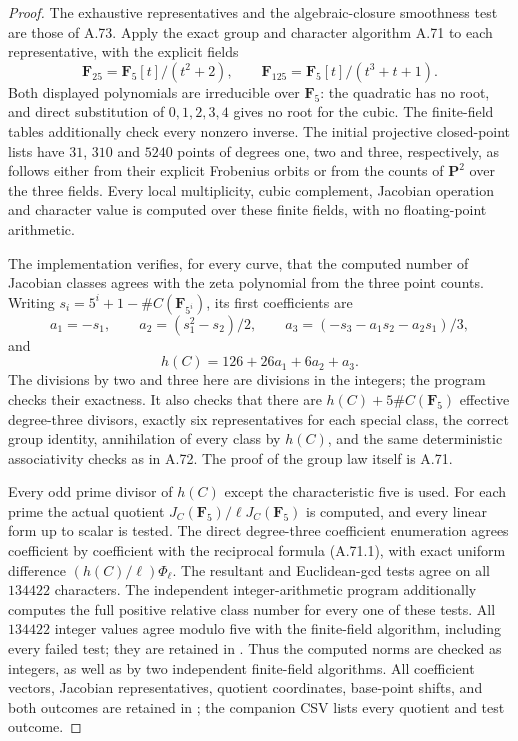 \documentclass[11pt]{article}
\begin{document}
\begin{proof}
The exhaustive representatives and the algebraic-closure
smoothness test are those of A.73. Apply the exact group
and character algorithm A.71 to each representative,
with the explicit fields
\[
 \mathbf F_{25}=\mathbf F_5[t]/(t^2+2),\qquad
 \mathbf F_{125}=\mathbf F_5[t]/(t^3+t+1).
\]
Both displayed polynomials are irreducible over
$\mathbf F_5$: the quadratic has no root, and direct
substitution of $0,1,2,3,4$ gives no root for the cubic.
The finite-field tables additionally check every nonzero
inverse. The initial projective closed-point lists have
$31$, $310$ and $5240$ points of degrees one, two and three,
respectively, as follows either from their explicit Frobenius
orbits or from the counts of $\mathbf P^2$ over the three
fields. Every local multiplicity, cubic complement,
Jacobian operation and character value is computed over
these finite fields, with no floating-point arithmetic.

The implementation verifies, for every curve, that the
computed number of Jacobian classes agrees with the zeta
polynomial from the three point counts. Writing
$s_i=5^i+1-\#C(\mathbf F_{5^i})$, its first coefficients
are
\[
 a_1=-s_1,\qquad
 a_2=(s_1^2-s_2)/2,\qquad
 a_3=(-s_3-a_1s_2-a_2s_1)/3,
\]
and
\[
                   h(C)=126+26a_1+6a_2+a_3.
\]
The divisions by two and three here are divisions in the
integers; the program checks their exactness. It also checks
that there are $h(C)+5\#C(\mathbf F_5)$ effective
degree-three divisors, exactly six representatives for each
special class, the correct group identity, annihilation of
every class by $h(C)$, and the same deterministic
associativity checks as in A.72. The proof of the group
law itself is A.71.

Every odd prime divisor of $h(C)$ except the characteristic
five is used. For each prime the actual quotient
$J_C(\mathbf F_5)/\ell J_C(\mathbf F_5)$ is computed,
and every linear form up to scalar is tested. The direct
degree-three coefficient enumeration agrees coefficient by
coefficient with the reciprocal formula (A.71.1), with
exact uniform difference $(h(C)/\ell)\Phi_\ell$.
The resultant and Euclidean-gcd tests agree on all
$134422$ characters. The independent integer-arithmetic
program  additionally
computes the full positive relative class number for every
one of these tests. All $134422$ integer values agree
modulo five with the finite-field algorithm, including every
failed test; they are retained in
. Thus the
computed norms are checked as integers, as well as by
two independent finite-field algorithms.
All coefficient vectors, Jacobian
representatives, quotient coordinates, base-point shifts,
and both outcomes are retained in
; the companion
CSV lists every quotient and test outcome.


\end{proof}
\end{document}
